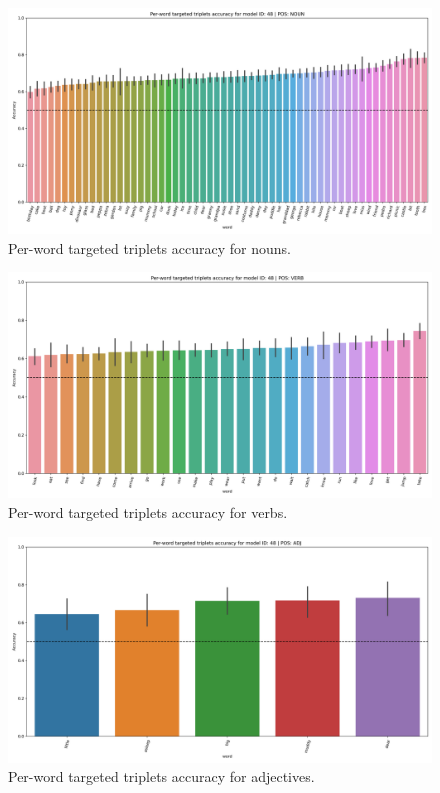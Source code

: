 \begin{figure}
  \centering
  \includegraphics[width=\textwidth]{results/targeted_triplets/results_NOUN_word.png}
  \caption{Per-word targeted triplets accuracy for nouns.}
  \label{fig:accuracy_targeted_triplets_nouns}
\end{figure}

\begin{figure}
  \centering
  \includegraphics[width=\textwidth]{results/targeted_triplets/results_VERB_word.png}
  \caption{Per-word targeted triplets accuracy for verbs.}
  \label{fig:accuracy_targeted_triplets_verbs}
\end{figure}

\begin{figure}
  \centering
  \includegraphics[width=\textwidth]{results/targeted_triplets/results_ADJ_word.png}
  \caption{Per-word targeted triplets accuracy for adjectives.}
  \label{fig:accuracy_targeted_triplets_adjectives}
\end{figure}

 
